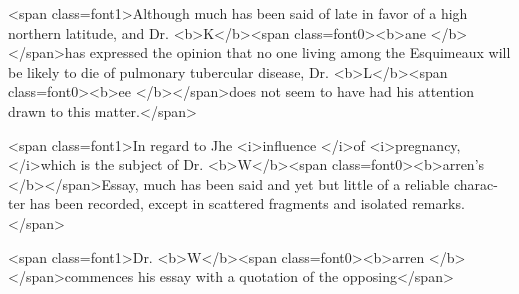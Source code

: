 <span class=font1>Although much has been said of late in favor of a high northern
latitude, and Dr. <b>K</b><span class=font0><b>ane </b></span>has expressed the opinion that no one living
among the Esquimeaux will be likely to die of pulmonary tubercular
disease, Dr. <b>L</b><span class=font0><b>ee </b></span>does not seem to have had his attention drawn to this
matter.</span>

<span class=font1>In regard to Jhe <i>influence </i>of <i>pregnancy, </i>which is the subject of Dr.
<b>W</b><span class=font0><b>arren's </b></span>Essay, much has been said and yet but little of a reliable charac-
ter has been recorded, except in scattered fragments and isolated remarks.</span>

<span class=font1>Dr. <b>W</b><span class=font0><b>arren </b></span>commences his essay with a quotation of the opposing</span>\endinput
